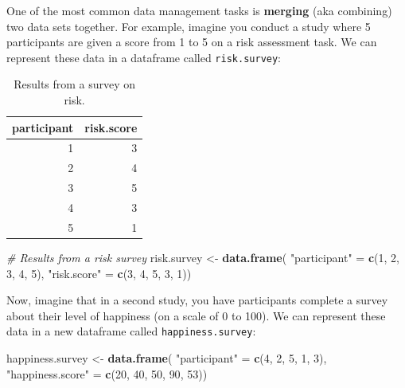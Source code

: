 \documentclass[]{book}
\newenvironment{Shaded}{\begin{snugshade}}{\end{snugshade}}
\newcommand{\KeywordTok}[1]{\textcolor[rgb]{0.13,0.29,0.53}{\textbf{{#1}}}}
\newcommand{\DecValTok}[1]{\textcolor[rgb]{0.00,0.00,0.81}{{#1}}}
\newcommand{\StringTok}[1]{\textcolor[rgb]{0.31,0.60,0.02}{{#1}}}
\newcommand{\CommentTok}[1]{\textcolor[rgb]{0.56,0.35,0.01}{\textit{{#1}}}}
\newcommand{\NormalTok}[1]{{#1}}
\theoremstyle{definition}
\theoremstyle{definition}
\theoremstyle{remark}
\begin{document}
One of the most common data management tasks is \textbf{merging} (aka
combining) two data sets together. For example, imagine you conduct a
study where 5 participants are given a score from 1 to 5 on a risk
assessment task. We can represent these data in a dataframe called
\texttt{risk.survey}:

\begin{table}

\caption{\label{tab:unnamed-chunk-254}Results from a survey on risk.}
\centering
\begin{tabular}[t]{r|r}
\hline
participant & risk.score\\
\hline
1 & 3\\
\hline
2 & 4\\
\hline
3 & 5\\
\hline
4 & 3\\
\hline
5 & 1\\
\hline
\end{tabular}
\end{table}

\begin{Shaded}
\begin{Highlighting}[]
\CommentTok{# Results from a risk survey}
\NormalTok{risk.survey <-}\StringTok{ }\KeywordTok{data.frame}\NormalTok{(}
  \StringTok{"participant"} \NormalTok{=}\StringTok{ }\KeywordTok{c}\NormalTok{(}\DecValTok{1}\NormalTok{, }\DecValTok{2}\NormalTok{, }\DecValTok{3}\NormalTok{, }\DecValTok{4}\NormalTok{, }\DecValTok{5}\NormalTok{),}
  \StringTok{"risk.score"} \NormalTok{=}\StringTok{ }\KeywordTok{c}\NormalTok{(}\DecValTok{3}\NormalTok{, }\DecValTok{4}\NormalTok{, }\DecValTok{5}\NormalTok{, }\DecValTok{3}\NormalTok{, }\DecValTok{1}\NormalTok{))}
\end{Highlighting}
\end{Shaded}

Now, imagine that in a second study, you have participants complete a
survey about their level of happiness (on a scale of 0 to 100). We can
represent these data in a new dataframe called
\texttt{happiness.survey}:

\begin{Shaded}
\begin{Highlighting}[]
\NormalTok{happiness.survey <-}\StringTok{ }\KeywordTok{data.frame}\NormalTok{(}
  \StringTok{"participant"} \NormalTok{=}\StringTok{ }\KeywordTok{c}\NormalTok{(}\DecValTok{4}\NormalTok{, }\DecValTok{2}\NormalTok{, }\DecValTok{5}\NormalTok{, }\DecValTok{1}\NormalTok{, }\DecValTok{3}\NormalTok{),}
  \StringTok{"happiness.score"} \NormalTok{=}\StringTok{ }\KeywordTok{c}\NormalTok{(}\DecValTok{20}\NormalTok{, }\DecValTok{40}\NormalTok{, }\DecValTok{50}\NormalTok{, }\DecValTok{90}\NormalTok{, }\DecValTok{53}\NormalTok{))}
\end{Highlighting}
\end{Shaded}
\end{document}
